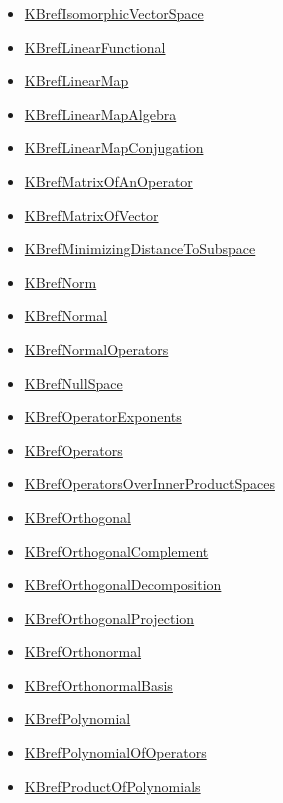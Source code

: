 \documentclass[11pt]{article}
\begin{document}
\begin{itemize}
\begin{itemize}
\item \href{math530/KBrefIsomorphicVectorSpace.org}{KBrefIsomorphicVectorSpace}
\item \href{math530/KBrefLinearFunctional.org}{KBrefLinearFunctional}
\item \href{math530/KBrefLinearMap.org}{KBrefLinearMap}
\item \href{math530/KBrefLinearMapAlgebra.org}{KBrefLinearMapAlgebra}
\item \href{math530/KBrefLinearMapConjugation.org}{KBrefLinearMapConjugation}
\item \href{math530/KBrefMatrixOfAnOperator.org}{KBrefMatrixOfAnOperator}
\item \href{math530/KBrefMatrixOfVector.org}{KBrefMatrixOfVector}
\item \href{math530/KBrefMinimizingDistanceToSubspace.org}{KBrefMinimizingDistanceToSubspace}
\item \href{math530/KBrefNorm.org}{KBrefNorm}
\item \href{math530/KBrefNormal.org}{KBrefNormal}
\item \href{math530/KBrefNormalOperators.org}{KBrefNormalOperators}
\item \href{math530/KBrefNullSpace.org}{KBrefNullSpace}
\item \href{math530/KBrefOperatorExponents.org}{KBrefOperatorExponents}
\item \href{math530/KBrefOperators.org}{KBrefOperators}
\item \href{math530/KBrefOperatorsOverInnerProductSpaces.org}{KBrefOperatorsOverInnerProductSpaces}
\item \href{math530/KBrefOrthogonal.org}{KBrefOrthogonal}
\item \href{math530/KBrefOrthogonalComplement.org}{KBrefOrthogonalComplement}
\item \href{math530/KBrefOrthogonalDecomposition.org}{KBrefOrthogonalDecomposition}
\item \href{math530/KBrefOrthogonalProjection.org}{KBrefOrthogonalProjection}
\item \href{math530/KBrefOrthonormal.org}{KBrefOrthonormal}
\item \href{math530/KBrefOrthonormalBasis.org}{KBrefOrthonormalBasis}
\item \href{math530/KBrefPolynomial.org}{KBrefPolynomial}
\item \href{math530/KBrefPolynomialOfOperators.org}{KBrefPolynomialOfOperators}
\item \href{math530/KBrefProductOfPolynomials.org}{KBrefProductOfPolynomials}

\end{itemize}
\end{itemize}
\end{document}
